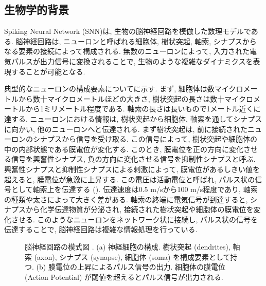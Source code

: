 \subsection{生物学的背景}
Spiking Neural Network (SNN)は, 生物の脳神経回路を模倣した数理モデルである.
脳神経回路は, ニューロンと呼ばれる細胞体, 樹状突起, 軸索, シナプスからなる要素の接続によって構成される\cite{braincomputing}.
無数のニューロンによって, 入力された電気パルスが出力信号に変換されることで, 生物のような複雑なダイナミクスを表現することが可能となる.

典型的なニューロンの構成要素についてに示す.
まず, 細胞体は数マイクロメートルから数十マイクロメートルほどの大きさ, 樹状突起の長さは数十マイクロメートルから1ミリメートル程度である.
軸索の長さは長いもので1メートル近くに達する.
ニューロンにおける情報は, 樹状突起から細胞体, 軸索を通してシナプスに向かい, 他のニューロンへと伝達される.
まず樹状突起は, 前に接続されたニューロンのシナプスから信号を受け取る.
この信号によって, 樹状突起や細胞体の中の内部状態である膜電位が変化する.
このとき, 膜電位を正の方向に変化させる信号を興奮性シナプス, 負の方向に変化させる信号を抑制性シナプスと呼ぶ.
興奮性シナプスと抑制性シナプスによる刺激によって, 膜電位があるしきい値を超えると, 膜電位が急激に上昇する.
この電圧は活動電位と呼ばれ, パルス状の信号として軸索上を伝達する ().
伝達速度は0.5 m/sから100 m/s程度であり, 軸索の種類や太さによって大きく差がある.
軸索の終端に電気信号が到達すると, シナプスから化学伝達物質が分泌され, 接続された樹状突起や細胞体の膜電位を変化させる.
このようなニューロンをネットワーク状に接続し, パルス状の信号を伝達することで, 脳神経回路は複雑な情報処理を行っている.

\begin{figure}[htb]
    \centering

    \begin{minipage}{0.497\textwidth}
        \centering
        
        \label{fig:brain:neuron}
    \end{minipage}
    \hspace{0.02\textwidth}
    \begin{minipage}{0.3474\textwidth}
        \centering
        
        \label{fig:brain:actionpotential}
    \end{minipage}

    \caption[脳神経回路の模式図]{
        脳神経回路の模式図 \cite{lobo2020spiking}.
        (a) 神経細胞の構成. 
        樹状突起 (dendrites), 軸索 (axon), シナプス (synapse), 細胞体 (soma) を構成要素として持つ.
        (b) 膜電位の上昇によるパルス信号の出力.
        細胞体の膜電位 (Action Potential) が閾値を超えるとパルス信号が出力される.
    }
\end{figure}